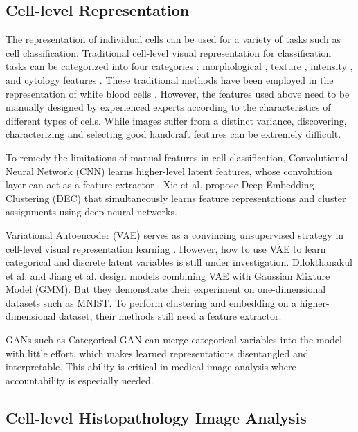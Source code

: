 \documentclass[journal]{IEEEtran}
\begin{document}
\subsection{Cell-level Representation} 

The representation of individual cells can be used for a variety of tasks such as cell classification. Traditional cell-level visual representation for classification tasks can be categorized into four categories \cite{Y2014Methods}: morphological \cite{Muthu2012Hybrid}, texture \cite{Xu2015Dual,Lorenzo2013Cervical}, intensity \cite{Dundar2011Computerized}, and cytology features \cite{Nguyen2011Prostate}. These traditional methods have been employed in the representation of white blood cells \cite{Tai2011Blood,Putzu2014Leucocyte,Su2014A}. However, the features used above need to be manually designed by experienced experts according to the characteristics of different types of cells. While images suffer from a distinct variance, discovering, characterizing and selecting good handcraft features can be extremely difficult.

To remedy the limitations of manual features in cell classification, Convolutional Neural Network (CNN) learns higher-level latent features, whose convolution layer can act as a feature extractor \cite{xu2017large}. Xie et al. \cite{xie2016unsupervised} propose Deep Embedding Clustering (DEC) that simultaneously learns feature representations and cluster assignments using deep neural networks.

Variational Autoencoder (VAE) \cite{kingma2013auto} serves as a convincing unsupervised strategy in cell-level visual representation learning \cite{Xu2016Stacked,Cruzroa2013A, zhang2016fusing}. However, how to use VAE to learn categorical and discrete latent variables is still under investigation. Dilokthanakul et al. \cite{dilokthanakul2016deep} and Jiang et al. \cite{jiang2017variational} design models combining VAE with Gaussian Mixture Model (GMM). But they demonstrate their experiment on one-dimensional datasets such as MNIST. To perform clustering and embedding on a higher-dimensional dataset, their methods still need a feature extractor. 

GANs such as Categorical GAN \cite{springenberg2015unsupervised} can merge categorical variables into the model with little effort, which makes learned representations disentangled and interpretable. This ability is critical in medical image analysis where accountability is especially needed.

\subsection{Cell-level Histopathology Image Analysis} 
\end{document}

